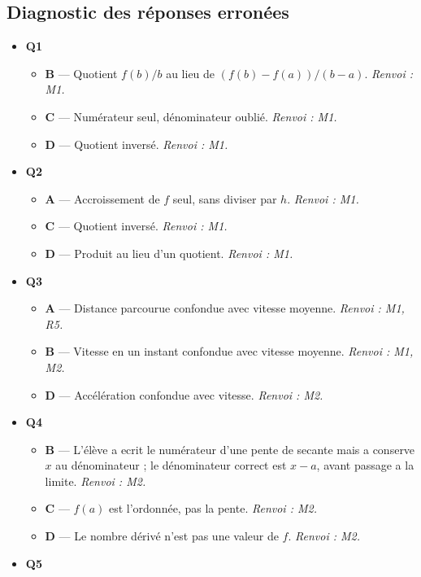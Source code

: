 \subsection*{Diagnostic des réponses erronées}

\begin{itemize}
  \item \textbf{Q1}
  \begin{itemize}
    \item \textbf{B} — Quotient $f(b)/b$ au lieu de $(f(b)-f(a))/(b-a)$. \emph{Renvoi : M1.}
    \item \textbf{C} — Numérateur seul, dénominateur oublié. \emph{Renvoi : M1.}
    \item \textbf{D} — Quotient inversé. \emph{Renvoi : M1.}
  \end{itemize}
  \item \textbf{Q2}
  \begin{itemize}
    \item \textbf{A} — Accroissement de $f$ seul, sans diviser par $h$. \emph{Renvoi : M1.}
    \item \textbf{C} — Quotient inversé. \emph{Renvoi : M1.}
    \item \textbf{D} — Produit au lieu d'un quotient. \emph{Renvoi : M1.}
  \end{itemize}
  \item \textbf{Q3}
  \begin{itemize}
    \item \textbf{A} — Distance parcourue confondue avec vitesse moyenne. \emph{Renvoi : M1, R5.}
    \item \textbf{B} — Vitesse en un instant confondue avec vitesse moyenne. \emph{Renvoi : M1, M2.}
    \item \textbf{D} — Accélération confondue avec vitesse. \emph{Renvoi : M2.}
  \end{itemize}
  \item \textbf{Q4}
  \begin{itemize}
    \item \textbf{B} — L'élève a ecrit le numérateur d'une pente de secante mais a conserve $x$ au dénominateur ; le dénominateur correct est $x-a$, avant passage a la limite. \emph{Renvoi : M2.}
    \item \textbf{C} — $f(a)$ est l'ordonnée, pas la pente. \emph{Renvoi : M2.}
    \item \textbf{D} — Le nombre dérivé n'est pas une valeur de $f$. \emph{Renvoi : M2.}
  \end{itemize}
  \item \textbf{Q5}

\end{itemize}
